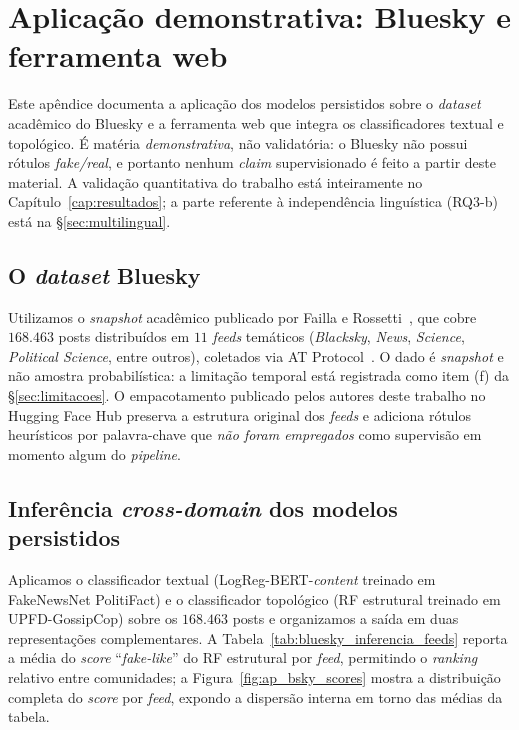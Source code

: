 \chapter{Aplica\c{c}\~ao demonstrativa: Bluesky e ferramenta web}
\label{ap:aplicacao}

Este ap\^endice documenta a aplica\c{c}\~ao dos modelos persistidos sobre
o \emph{dataset} acad\^emico do Bluesky e a ferramenta web que integra os
classificadores textual e topol\'ogico. \'E mat\'eria
\emph{demonstrativa}, n\~ao validat\'oria: o Bluesky n\~ao possui
r\'otulos \emph{fake/real}, e portanto nenhum \emph{claim} supervisionado
\'e feito a partir deste material. A valida\c{c}\~ao quantitativa do
trabalho est\'a inteiramente no Cap\'itulo~\ref{cap:resultados}; a parte
referente \`a independ\^encia lingu\'istica (RQ3-b) est\'a na
\S\ref{sec:multilingual}.

\section{O \emph{dataset} Bluesky}
\label{sec:ap_bsky_dataset}

Utilizamos o \emph{snapshot} acad\^emico publicado por Failla e
Rossetti~\cite{failla2024bluesky}, que cobre $168.463$ posts distribu\'idos
em $11$ \emph{feeds} tem\'aticos (\emph{Blacksky}, \emph{News},
\emph{Science}, \emph{Political Science}, entre outros), coletados via
AT Protocol~\cite{kleppmann2024atproto}. O dado \'e \emph{snapshot}
e n\~ao amostra probabil\'istica: a limita\c{c}\~ao temporal est\'a
registrada como item (f) da \S\ref{sec:limitacoes}. O empacotamento
publicado pelos autores deste trabalho no Hugging Face Hub
\cite{sibila2025bluesky} preserva a estrutura origi\-nal dos
\emph{feeds} e adiciona r\'otulos heur\'isticos por palavra-chave que
\emph{n\~ao foram empregados} como supervis\~ao em momento algum do
\emph{pipeline}.

\section{Infer\^encia \emph{cross-domain} dos modelos persistidos}
\label{sec:ap_bsky_inferencia}

Aplicamos o classificador textual (LogReg-BERT-\emph{content} treinado em
FakeNewsNet PolitiFact) e o classificador topol\'ogico (RF estrutural
treinado em UPFD-GossipCop) sobre os $168.463$ posts e organizamos a
sa\'ida em duas representa\c{c}\~oes complementares. A
Tabela~\ref{tab:bluesky_inferencia_feeds} reporta a m\'edia do \emph{score}
``\emph{fake-like}'' do RF estrutural por \emph{feed}, permitindo o
\emph{ranking} relativo entre comunidades; a
Figura~\ref{fig:ap_bsky_scores} mostra a distribui\c{c}\~ao completa
do \emph{score} por \emph{feed}, expondo a dispers\~ao interna em
torno das m\'edias da tabela.

